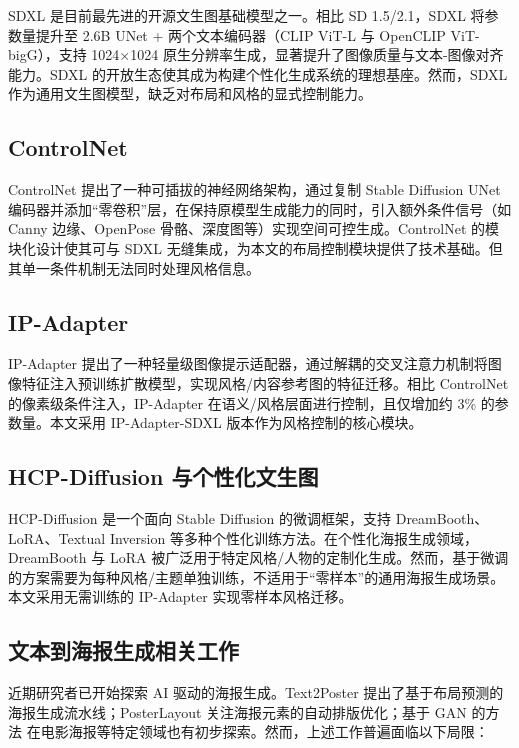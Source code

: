 \documentclass[10pt,a4paper]{article}
\begin{document}
SDXL\cite{podell2023sdxl} 是目前最先进的开源文生图基础模型之一。相比 SD 1.5/2.1，SDXL 将参数量提升至 2.6B UNet + 两个文本编码器（CLIP ViT-L 与 OpenCLIP ViT-bigG），支持 1024×1024 原生分辨率生成，显著提升了图像质量与文本-图像对齐能力。SDXL 的开放生态使其成为构建个性化生成系统的理想基座。然而，SDXL 作为通用文生图模型，缺乏对布局和风格的显式控制能力。

\subsection{ControlNet}

ControlNet\cite{zhang2023controlnet} 提出了一种可插拔的神经网络架构，通过复制 Stable Diffusion UNet 编码器并添加``零卷积''层，在保持原模型生成能力的同时，引入额外条件信号（如 Canny 边缘、OpenPose 骨骼、深度图等）实现空间可控生成。ControlNet 的模块化设计使其可与 SDXL 无缝集成，为本文的布局控制模块提供了技术基础。但其单一条件机制无法同时处理风格信息。

\subsection{IP-Adapter}

IP-Adapter\cite{ye2023ipadapter} 提出了一种轻量级图像提示适配器，通过解耦的交叉注意力机制将图像特征注入预训练扩散模型，实现风格/内容参考图的特征迁移。相比 ControlNet 的像素级条件注入，IP-Adapter 在语义/风格层面进行控制，且仅增加约 3\% 的参数量。本文采用 IP-Adapter-SDXL 版本作为风格控制的核心模块。

\subsection{HCP-Diffusion 与个性化文生图}

HCP-Diffusion\cite{hcpdiff} 是一个面向 Stable Diffusion 的微调框架，支持 DreamBooth、LoRA、Textual Inversion 等多种个性化训练方法。在个性化海报生成领域，DreamBooth 与 LoRA 被广泛用于特定风格/人物的定制化生成。然而，基于微调的方案需要为每种风格/主题单独训练，不适用于``零样本''的通用海报生成场景。本文采用无需训练的 IP-Adapter 实现零样本风格迁移。

\subsection{文本到海报生成相关工作}

近期研究者已开始探索 AI 驱动的海报生成。Text2Poster\cite{jin2022text2poster} 提出了基于布局预测的海报生成流水线；PosterLayout\cite{hsu2023posterlayout} 关注海报元素的自动排版优化；基于 GAN 的方法\cite{karras2019stylegan} 在电影海报等特定领域也有初步探索。然而，上述工作普遍面临以下局限：
\end{document}
